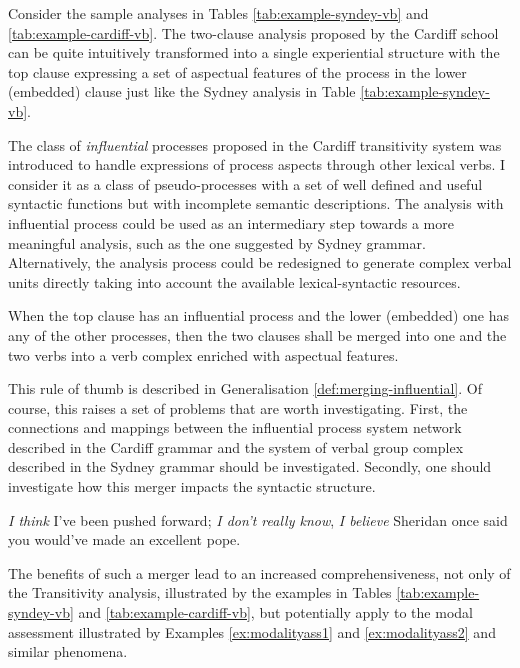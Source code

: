     Consider the sample analyses in Tables \ref{tab:example-syndey-vb} and \ref{tab:example-cardiff-vb}. The two-clause analysis proposed by the Cardiff school can be quite intuitively transformed into a single experiential structure with the top clause expressing a set of aspectual features of the process in the lower (embedded) clause just like the Sydney analysis in Table \ref{tab:example-syndey-vb}. 

    The class of \textit{influential} processes proposed in the Cardiff transitivity system was introduced to handle expressions of process aspects through other lexical verbs. I consider it as a class of pseudo-processes with a set of well defined and useful syntactic functions but with incomplete semantic descriptions. The analysis with influential process could be used as an intermediary step towards a more meaningful analysis, such as the one suggested by Sydney grammar. Alternatively, the analysis process could be redesigned to generate complex verbal units directly taking into account the available lexical-syntactic resources.  

    \begin{generalization} \label{def:merging-influential}
    	When the top clause has an influential process and the lower (embedded) one has any of the other processes, then the two clauses shall be merged into one and the two verbs into a verb complex enriched with aspectual features.
    \end{generalization}

    This rule of thumb is described in Generalisation \ref{def:merging-influential}. Of course, this raises a set of problems that are worth investigating. First, the connections and mappings between the influential process system network described in the Cardiff grammar and the system of verbal group complex described in the Sydney grammar \citep[589]{Halliday2013} should be investigated. Secondly, one should investigate how this merger impacts the syntactic structure. 

    \begin{exe}
    	\ex\label{ex:modalityass1} \textit{I think} I've been pushed forward; \textit{I don't really know}, \citep[183]{Halliday2013}
    	\ex\label{ex:modalityass2} \textit{I believe} Sheridan once said you would've made an excellent pope. \citep[182]{Halliday2013}
    \end{exe}
    
    The benefits of such a merger lead to an increased comprehensiveness, not only of the Transitivity analysis, illustrated by the examples in Tables \ref{tab:example-syndey-vb} and \ref{tab:example-cardiff-vb}, but potentially apply to the modal assessment illustrated by Examples \ref{ex:modalityass1} and \ref{ex:modalityass2} and similar phenomena. 

